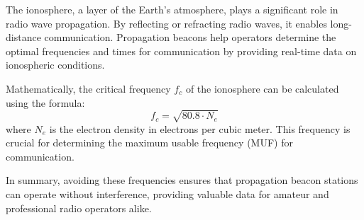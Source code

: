 The ionosphere, a layer of the Earth's atmosphere, plays a significant role in radio wave propagation. By reflecting or refracting radio waves, it enables long-distance communication. Propagation beacons help operators determine the optimal frequencies and times for communication by providing real-time data on ionospheric conditions. 

Mathematically, the critical frequency \( f_c \) of the ionosphere can be calculated using the formula:
\[
f_c = \sqrt{80.8 \cdot N_e}
\]
where \( N_e \) is the electron density in electrons per cubic meter. This frequency is crucial for determining the maximum usable frequency (MUF) for communication.

In summary, avoiding these frequencies ensures that propagation beacon stations can operate without interference, providing valuable data for amateur and professional radio operators alike.

